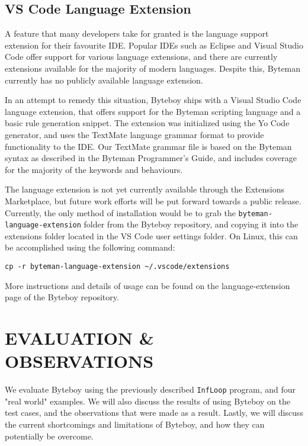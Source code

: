 \documentclass[letterpaper,twocolumn,10pt]{article}
\begin{document}
\subsection{VS Code Language Extension}

A feature that many developers take for granted is the language support extension for their favourite IDE. Popular IDEs such as Eclipse and Visual Studio Code offer support for various language extensions, and there are currently extensions available for the majority of modern languages. Despite this, Byteman currently has no publicly available language extension. 

In an attempt to remedy this situation, Byteboy ships with a Visual Studio Code language extension, that offers support for the Byteman scripting language and a basic rule generation snippet. The extension was initialized using the Yo Code generator\cite{yocode}, and uses the TextMate language grammar format\cite{textmate} to provide functionality to the IDE. Our TextMate grammar file is based on the Byteman syntax as described in the Byteman Programmer's Guide\cite{bytemanguide}, and includes coverage for the majority of the keywords and behaviours.

The language extension is not yet currently available through the Extensions Marketplace, but future work efforts will be put forward towards a public release. Currently, the only method of installation would be to grab the {\tt byteman-language-extension} folder from the Byteboy repository, and copying it into the extensions folder located in the VS Code user settings folder. On Linux, this can be accomplished using the following command: 
\begin{center}
{\tt cp -r byteman-language-extension \textasciitilde/.vscode/extensions}
\end{center}
More instructions and details of usage can be found on the language-extension page of the Byteboy repository\cite{bytemanextension}.

\section{EVALUATION \& OBSERVATIONS}

We evaluate Byteboy using the previously described {\tt InfLoop} program, and four "real world" examples. We will also discuss the results of using Byteboy on the test cases, and the observations that were made as a result. Lastly, we will discuss the current shortcomings and limitations of Byteboy, and how they can potentially be overcome.
\end{document}
